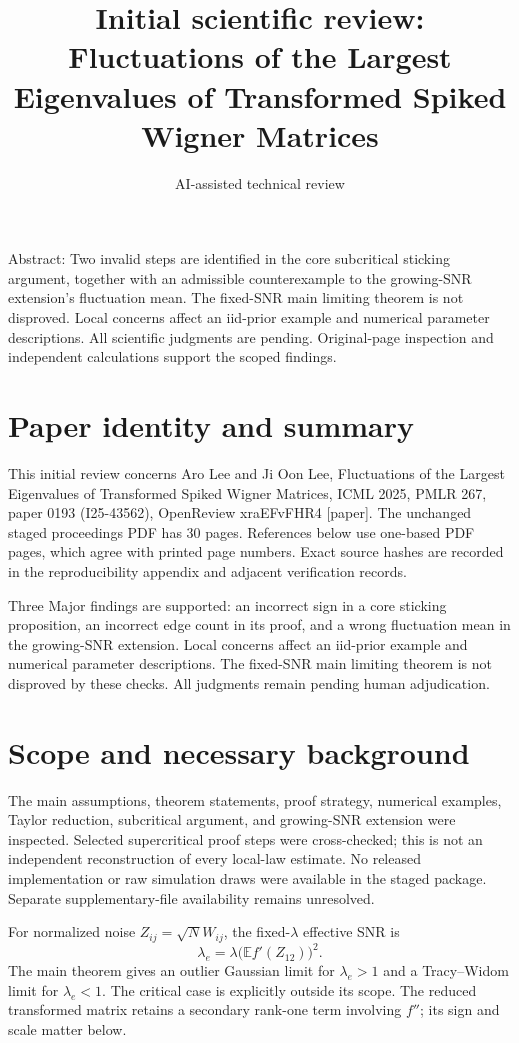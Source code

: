 \documentclass[10pt]{article}
\title{Initial scientific review: Fluctuations of the Largest Eigenvalues of Transformed Spiked Wigner Matrices}
\author{AI-assisted technical review}
\date{}
\begin{document}
\maketitle
Abstract: Two invalid steps are identified in the core subcritical sticking argument, together with an admissible counterexample to the growing-SNR extension’s fluctuation mean. The fixed-SNR main limiting theorem is not disproved. Local concerns affect an iid-prior example and numerical parameter descriptions. All scientific judgments are pending. Original-page inspection and independent calculations support the scoped findings.\par
\section*{Paper identity and summary}
This initial review concerns Aro Lee and Ji Oon Lee, Fluctuations of the Largest Eigenvalues of Transformed Spiked Wigner Matrices, ICML 2025, PMLR 267, paper 0193 (I25-43562), OpenReview xraEFvFHR4 [paper]. The unchanged staged proceedings PDF has 30 pages. References below use one-based PDF pages, which agree with printed page numbers. Exact source hashes are recorded in the reproducibility appendix and adjacent verification records.\par
Three Major findings are supported: an incorrect sign in a core sticking proposition, an incorrect edge count in its proof, and a wrong fluctuation mean in the growing-SNR extension. Local concerns affect an iid-prior example and numerical parameter descriptions. The fixed-SNR main limiting theorem is not disproved by these checks. All judgments remain pending human adjudication.\par
\section*{Scope and necessary background}
The main assumptions, theorem statements, proof strategy, numerical examples, Taylor reduction, subcritical argument, and growing-SNR extension were inspected. Selected supercritical proof steps were cross-checked; this is not an independent reconstruction of every local-law estimate. No released implementation or raw simulation draws were available in the staged package. Separate supplementary-file availability remains unresolved.\par
For normalized noise \(Z_{ij}=\sqrt N W_{ij}\), the fixed-\(\lambda\) effective SNR is \[\lambda_e=\lambda\bigl(\mathbb E f'(Z_{12})\bigr)^2.\] The main theorem gives an outlier Gaussian limit for \(\lambda_e>1\) and a Tracy–Widom limit for \(\lambda_e<1\). The critical case is explicitly outside its scope. The reduced transformed matrix retains a secondary rank-one term involving \(f''\); its sign and scale matter below.\par
\end{document}

